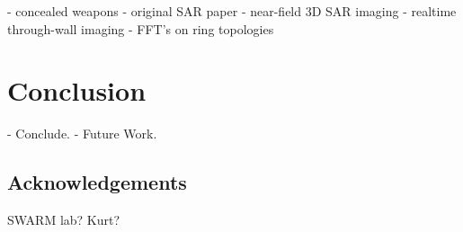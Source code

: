 - concealed weapons
- original SAR paper
- near-field 3D SAR imaging
- realtime through-wall imaging
- FFT's on ring topologies

\section{Conclusion}
- Conclude.
- Future Work.

\subsection*{Acknowledgements}
SWARM lab?
Kurt?


{\small


}

